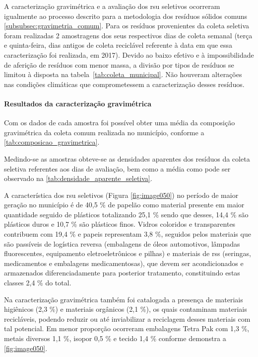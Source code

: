 	A caracterização gravimétrica e a avaliação dos \gls{rsu} seletivos ocorreram igualmente ao processo descrito para a metodologia dos resíduos sólidos comuns \ref{subsubsec:gravimetria_comum}. Para os resíduos provenientes da coleta seletiva foram realizadas 2 amostragens dos seus respectivos dias de coleta semanal (terça e quinta-feira, dias antigos de coleta reciclável referente à data em que essa caracterização foi realizada, em 2017). Devido ao baixo efetivo e à impossibilidade de aferição de resíduos com menor massa, a divisão por tipos de resíduos se limitou à disposta na tabela~\ref{tab:coleta_municipal}. Não houveram alterações nas condições climáticas que comprometessem a caracterização desses resíduos.

	
	
	
	\paragraph{\textbf{Resultados da caracterização gravimétrica}}
	
	Com os dados de cada amostra foi possível obter uma média da composição gravimétrica da coleta comum realizada no município, conforme a \autoref{tab:composicao_gravimetrica}.
	
	
	
	Medindo-se as amostras obteve-se as densidades aparentes dos resíduos da coleta seletiva referentes aos dias de avaliação, bem como a média como pode ser observado na \autoref{tab:densidade_aparente_seletiva}.
	
	
	
	A característica dos \gls{rsu} seletivos (Figura \ref{fig:image050}) no período de maior geração no município é de 40,5 \% de papelão como material presente em maior quantidade seguido de plásticos totalizando 25,1 \% sendo que desses, 14,4 \% são plásticos duros e 10,7 \% são plásticos finos. Vidros coloridos e transparentes contribuem com 19,4 \% e papeis representam 3,8 \%, seguidos pelos materiais que são passíveis de logística reversa (embalagens de óleos automotivos, lâmpadas fluorescentes, equipamento eletroeletrônicos e pilhas) e materiais de \gls{rss} (seringas, medicamentos e embalagens medicamentosas), que devem ser acondicionados e armazenados diferenciadamente para posterior tratamento, constituindo estas classes 2,4 \% do total. 
	
	Na caracterização gravimétrica também foi catalogada a presença de materiais higiênicos (2,3 \%) e materiais orgânicos (2,1 \%), os quais contaminam materiais recicláveis, podendo reduzir ou até inviabilizar a reciclagem desses materiais com tal potencial. Em menor proporção ocorreram embalagens Tetra Pak com 1,3 \%, metais diversos 1,1 \%, isopor 0,5 \% e tecido 1,4 \% conforme demonstra a \autoref{fig:image050}.
	
